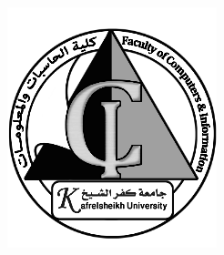 \thispagestyle{empty}
\addtolength{\topmargin}{0in}
\vspace*{-1cm}  %

\noindent
\begin{minipage}{0.2\textwidth}
    \includegraphics[width=0.9\linewidth]{FrontMatter/Figures/fci.png}  %
\end{minipage}
\hfill
\begin{minipage}{0.55\textwidth}
    \begin{center}
        {\large \textbf{\tinstitution}}\\
        {\large \textbf{\tuniversity}}
    \end{center}
\end{minipage}
\hfill
